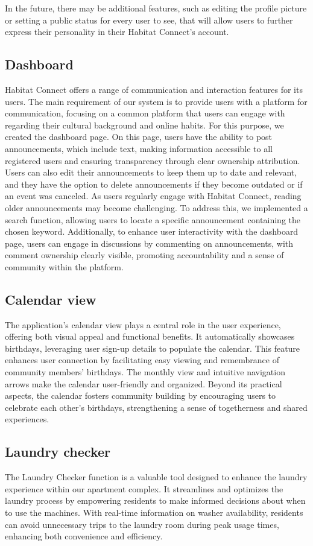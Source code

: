 \documentclass[conference]{IEEEtran}
\begin{document}
In the future, there may be additional features, such as editing the profile picture or setting a public status for every user to see, that will allow users to further express their personality in their Habitat Connect’s account.
\subsection{Dashboard}
Habitat Connect offers a range of communication and interaction features for its users. The main requirement of our system is to provide users with a platform for communication, focusing on a common platform that users can engage with regarding their cultural background and online habits. For this purpose, we created the dashboard page. On this page, users have the ability to post announcements, which include text, making information accessible to all registered users and ensuring transparency through clear ownership attribution. Users can also edit their announcements to keep them up to date and relevant, and they have the option to delete announcements if they become outdated or if an event was canceled.  As users regularly engage with Habitat Connect, reading older announcements may become challenging. To address this, we implemented a search function, allowing users to locate a specific announcement containing the chosen keyword.  Additionally, to enhance user interactivity with the dashboard page, users can engage in discussions by commenting on announcements, with comment ownership clearly visible, promoting accountability and a sense of community within the platform.
\subsection{Calendar view}
The application's calendar view plays a central role in the user experience, offering both visual appeal and functional benefits. It automatically showcases birthdays, leveraging user sign-up details to populate the calendar. This feature enhances user connection by facilitating easy viewing and remembrance of community members' birthdays. The monthly view and intuitive navigation arrows make the calendar user-friendly and organized. Beyond its practical aspects, the calendar fosters community building by encouraging users to celebrate each other's birthdays, strengthening a sense of togetherness and shared experiences.
\subsection{Laundry checker}
The Laundry Checker function is a valuable tool designed to enhance the laundry experience within our apartment complex. It streamlines and optimizes the laundry process by empowering residents to make informed decisions about when to use the machines. With real-time information on washer availability, residents can avoid unnecessary trips to the laundry room during peak usage times, enhancing both convenience and efficiency.
\end{document}
